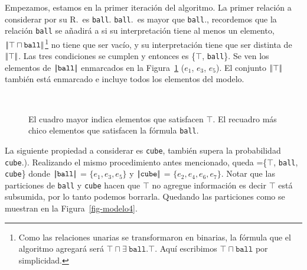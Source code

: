 Empezamos, estamos en la primer iteraci\'on del algoritmo. La primer relaci\'on a considerar por su R.\puse\ es \texttt{ball}. \texttt{ball}.\puse\ es mayor que \texttt{ball}.\randomuse, recordemos que la relaci\'on \texttt{ball} se a\~nadir\'a a \RE si su interpretaci\'on tiene al menos un elemento, $|\!|\top \sqcap \texttt{ball}|\!|$\footnote{Como las relaciones unarias se transformaron en binarias, la f\'ormula que el algoritmo agregar\'a ser\'a $\top \sqcap \exists\ \texttt{ball}.\top$. Aqu\'i escribimos $\top \sqcap \texttt{ball}$ por simplicidad.} no tiene que ser vac\'io, y su interpretaci\'on tiene que ser distinta de $|\!|\top|\!|$. Las tres condiciones se cumplen y \RE entonces es \{$\top$, \texttt{ball}\}. Se ven los elementos de $|\!|\texttt{ball}|\!|$ enmarcados en la Figura~\ref{fig-modelo3} ($e_1$, $e_3$, $e_5$). El conjunto $|\!|\top|\!|$ tambi\'en est\'a enmarcado e incluye todos los elementos del modelo.

\begin{figure}[H]
\begin{center}
\\[0pt]
\caption{El cuadro mayor indica elementos que satisfacen $\top$. El recuadro m\'as chico elementos que satisfacen la f\'ormula \texttt{ball}.}
\label{fig-modelo3}
\end{center}
\end{figure}

La siguiente propiedad a considerar es \texttt{cube}, tambi\'en supera la probabilidad \texttt{cube}.\randomuse). Realizando el mismo procedimiento antes mencionado, queda \RE =\{$\top$, \texttt{ball}, \texttt{cube}\} donde $|\!|\texttt{ball}|\!|$ = $\{e_1,e_3,e_5\}$ y
$|\!|\texttt{cube}|\!|$ = $\{e_2, e_4, e_6, e_7\}$. Notar que las particiones de  \texttt{ball} y \texttt{cube} hacen que $\top$ no agregue informaci\'on es decir $\top$ est\'a subsumida, por lo tanto podemos borrarla. Quedando las particiones como se muestran en la Figura~\ref{fig-modelo4}.

